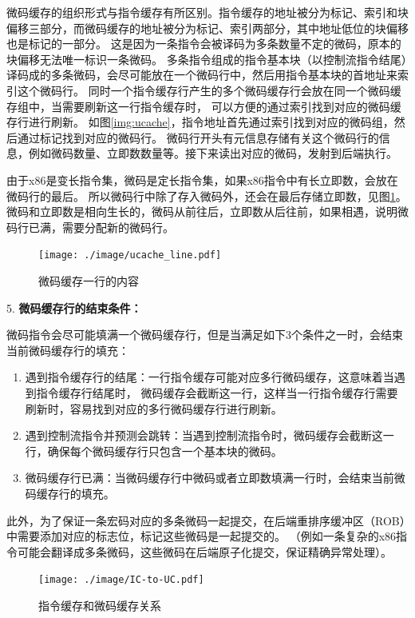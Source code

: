 微码缓存的组织形式与指令缓存有所区别。指令缓存的地址被分为标记、索引和块偏移三部分，而微码缓存的地址被分为标记、索引两部分，其中地址低位的块偏移也是标记的一部分。
这是因为一条指令会被译码为多条数量不定的微码，原本的块偏移无法唯一标识一条微码。
多条指令组成的指令基本块（以控制流指令结尾）译码成的多条微码，会尽可能放在一个微码行中，然后用指令基本块的首地址来索引这个微码行。
同时一个指令缓存行产生的多个微码缓存行会放在同一个微码缓存组中，当需要刷新这一行指令缓存时， 可以方便的通过索引找到对应的微码缓存行进行刷新。
如图\ref{img:ucache}，指令地址首先通过索引找到对应的微码组，然后通过标记找到对应的微码行。
微码行开头有元信息存储有关这个微码行的信息，例如微码数量、立即数数量等。接下来读出对应的微码，发射到后端执行。

由于x86是变长指令集，微码是定长指令集，如果x86指令中有长立即数，会放在微码行的最后。
所以微码行中除了存入微码外，还会在最后存储立即数，见图\ref{img:ucache_line}。
微码和立即数是相向生长的，微码从前往后，立即数从后往前，如果相遇，说明微码行已满，需要分配新的微码行。

\begin{figure}[!htbp]
  \centering
  \texttt{[image: ./image/ucache\_line.pdf]}
  \caption{微码缓存一行的内容}
  \label{img:ucache_line}
\end{figure}

5. \textbf{微码缓存行的结束条件：}

微码指令会尽可能填满一个微码缓存行，但是当满足如下3个条件之一时，会结束当前微码缓存行的填充\cite{solomonMicrooperationCachePower2001}：
\begin{enumerate}
  \item 遇到指令缓存行的结尾：一行指令缓存可能对应多行微码缓存，这意味着当遇到指令缓存行结尾时，
  微码缓存会截断这一行，这样当一行指令缓存行需要刷新时，容易找到对应的多行微码缓存行进行刷新。
  \item 遇到控制流指令并预测会跳转：当遇到控制流指令时，微码缓存会截断这一行，确保每个微码缓存行只包含一个基本块的微码。
  \item 微码缓存行已满：当微码缓存行中微码或者立即数填满一行时，会结束当前微码缓存行的填充。
\end{enumerate}

此外，为了保证一条宏码对应的多条微码一起提交，在后端重排序缓冲区（ROB）中需要添加对应的标志位，标记这些微码是一起提交的。
（例如一条复杂的x86指令可能会翻译成多条微码，这些微码在后端原子化提交，保证精确异常处理）。

\begin{figure}[!htbp]
  \centering
  \texttt{[image: ./image/IC-to-UC.pdf]}
  \caption{指令缓存和微码缓存关系}
  \label{img:IC_to_UC}
\end{figure}

